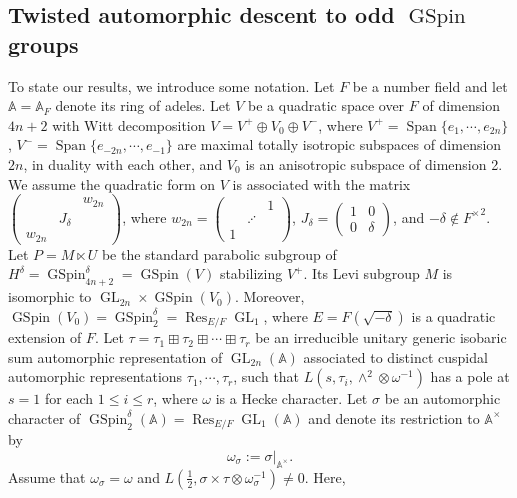 \documentclass[12pt]{amsart}
\newcommand{\A}{\mathbb{A}}
\newcommand{\Res}{\operatorname{Res}}
\newcommand{\Span}{\operatorname{Span}}
\theoremstyle{remark}
\DeclareMathOperator{\GL}{GL}
\DeclareMathOperator{\GSpin}{GSpin}
\begin{document}
\subsection{Twisted automorphic descent to odd $\GSpin$ groups}
\label{subsection-Intro-twisted-descent}
To state our results, we introduce some notation. Let $F$ be a number field and let $\A=\A_F$ denote its ring of adeles. Let $V$ be a quadratic space over $F$ of dimension $4n+2$ with Witt decomposition $V=V^+\oplus V_0\oplus V^-$, where 
$V^+=\Span\{e_1, \cdots, e_{2n}\}$, $V^-=\Span\{e_{-2n}, \cdots, e_{-1}\}$
 are maximal totally isotropic subspaces of dimension $2n$, in duality with each other, and $V_0$ is an anisotropic subspace of dimension 2. We assume the quadratic form on $V$ is associated with the matrix $\left( \begin{smallmatrix}
   &&w_{2n}\\
   &J_\delta&\\
   w_{2n}&&
  \end{smallmatrix}\right)$, where $w_{2n}=\left( \begin{smallmatrix} & & 1\\ &\iddots & \\ 1&& \end{smallmatrix}\right)$, $J_\delta=\left(\begin{smallmatrix} 1 &0\\ 0 &\delta\end{smallmatrix}\right)$, and $-\delta\not\in {F^\times}^2$. Let $P=M\ltimes U$ be the standard parabolic subgroup of $H^\delta=\GSpin_{4n+2}^\delta=\GSpin(V)$ stabilizing $V^+$. Its Levi subgroup $M$ is isomorphic to $\GL_{2n}\times \GSpin(V_0)$. Moreover, $\GSpin(V_0)=\GSpin^\delta_2=\Res_{E/F}\GL_1$, where $E=F(\sqrt{-\delta})$ is a quadratic extension of $F$.
Let $\tau=\tau_1\boxplus \tau_2\boxplus \cdots \boxplus \tau_r$ be an irreducible unitary generic isobaric sum automorphic representation of $\GL_{2n}(\A)$ associated to distinct cuspidal automorphic representations $\tau_1, \cdots, \tau_r$, such that $L(s, \tau_i, \wedge^2\otimes\omega^{-1})$ has a pole at $s=1$ for each $1\le i\le r$, where $\omega$ is a Hecke character.  
Let $\sigma$ be an automorphic character of $\GSpin^\delta_2(\A)=\Res_{E/F}\GL_1(\A)$ and denote its restriction to $\mathbb{A}^\times$ by
\begin{equation*}
\omega_{\sigma}:=\sigma|_{\A^\times}.	
\end{equation*}
Assume that $\omega_{\sigma}=\omega$ and 
 $L(\frac{1}{2}, \sigma\times \tau\otimes \omega_\sigma^{-1})\neq 0$. Here, 
\end{document}
